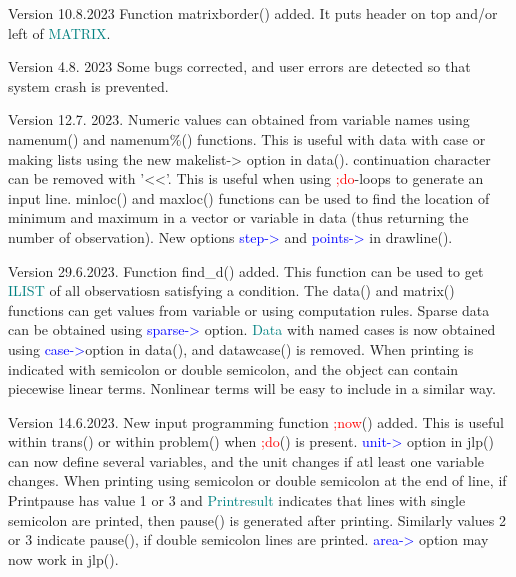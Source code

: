 Version 10.8.2023 Function \textcolor{VioletRed}{matrixborder}() added. It puts header on top and/or left of \textcolor{teal}{MATRIX}. 
 
Version 4.8. 2023 Some bugs corrected, and user errors are detected so that system crash is prevented. 
 
Version 12.7. 2023. Numeric values can obtained from variable names using \textcolor{VioletRed}{namenum}() and 
namenum\%() functions. This is useful with data with case or making lists using the new makelist-> option in \textcolor{VioletRed}{data}(). 
continuation character can be removed with '<<'. This is useful when using \textcolor{Red}{;do}-loops to generate 
an input line. \textcolor{VioletRed}{minloc}() and \textcolor{VioletRed}{maxloc}() functions can be used to find the location of minimum 
and maximum in a vector or variable in data (thus returning the number of observation). 
New options \textcolor{blue}{step->} and \textcolor{blue}{points->} in \textcolor{VioletRed}{drawline}(). 
 
Version 29.6.2023. Function \textcolor{VioletRed}{find\_d}() added. This function can be used to get \textcolor{teal}{ILIST} 
of all observatiosn satisfying a condition. The \textcolor{VioletRed}{data}() and \textcolor{VioletRed}{matrix}() functions can get values 
from variable or using computation rules. Sparse data can be obtained using \textcolor{blue}{sparse->} 
option. \textcolor{teal}{Data} with named cases is now obtained using \textcolor{blue}{case->}option in \textcolor{VioletRed}{data}(), 
and \textcolor{VioletRed}{datawcase}() is removed. When printing is indicated with semicolon or double semicolon, and the object 
can contain piecewise linear terms. Nonlinear terms will be easy to include in  a similar way. 
 
 
Version   14.6.2023. New input programming function \textcolor{Red}{;now}() added. This is useful 
within \textcolor{VioletRed}{trans}() or within \textcolor{VioletRed}{problem}() when \textcolor{Red}{;do}() is present. \textcolor{blue}{unit->} option in \textcolor{VioletRed}{jlp}() can now define 
several variables, and the unit changes if atl least one variable changes. 
When printing using semicolon or double semicolon at the end of line, if Printpause has value 1 or 3 and 
\textcolor{teal}{Printresult} indicates that lines with single semicolon are printed, then 
\textcolor{VioletRed}{pause}() is generated after printing. Similarly values 2 or 3 indicate \textcolor{VioletRed}{pause}(), if double semicolon lines 
are printed. \textcolor{blue}{area->} option may now work in \textcolor{VioletRed}{jlp}(). 
 
